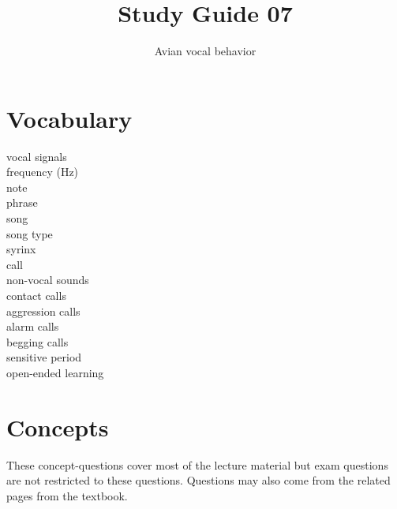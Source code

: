 \documentclass[nofonts, letterpaper]{tufte-handout}
\title{Study Guide 07}
\author{Avian vocal behavior}
\date{} %
\begin{document}
\maketitle	%


\section{Vocabulary}
\vspace{-1\baselineskip}
\begin{multicols}{2}
vocal signals \\
frequency (Hz) \\
note \\
phrase \\
song \\
song type \\
syrinx \\
call \\
non-vocal sounds \\
contact calls \\
aggression calls \\
alarm calls \\
begging calls \\
sensitive period \\
open-ended learning 
\end{multicols}

\section{Concepts}

These concept-questions cover most of the lecture material but exam questions are not restricted to these questions. Questions may also come from the related pages from the textbook.\vspace{\baselineskip}
\end{document}
